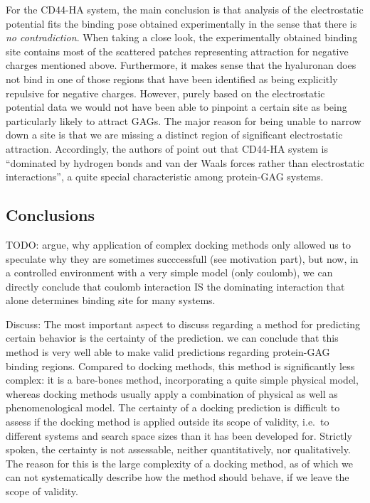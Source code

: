 For the CD44-HA system, the main conclusion is that analysis of the
electrostatic potential fits the binding pose obtained experimentally in the
sense that there is \textit{no contradiction}. When taking a close look, the
experimentally obtained binding site contains most of the scattered patches
representing attraction for negative charges mentioned above. Furthermore, it
makes sense that the hyaluronan does not bind in one of those regions that have
been identified as being explicitly repulsive for negative charges. However,
purely based on the electrostatic potential data we would not have been able to
pinpoint a certain site as being particularly likely to attract GAGs. The major
reason for being unable to narrow down a site is that we are missing a distinct
region of significant electrostatic attraction. Accordingly, the authors of
\cite{cd44_hya_2007} point out that CD44-HA system is  \enquote{dominated by
hydrogen bonds and van der Waals forces rather than electrostatic interactions},
a quite special characteristic among protein-GAG systems.



\subsection{Conclusions}

TODO: argue, why application of complex docking methods only allowed us to
speculate why they are sometimes succcessfull (see motivation part), but now,
in a controlled environment with a very simple model (only coulomb), we can
directly conclude that coulomb interaction IS the dominating interaction that
alone determines binding site for many systems.

Discuss: The most important aspect to discuss regarding a method for predicting
certain behavior is the certainty of the prediction. we can conclude that this
method is very well able to make valid predictions regarding protein-GAG binding
regions. Compared to docking methods, this method is significantly less complex:
it is a bare-bones method, incorporating a quite simple physical model, whereas
docking methods usually apply a combination of physical as well as
phenomenological model. The certainty of a docking prediction is difficult to
assess if the docking method is applied outside its scope of validity, i.e.\ to
different systems and search space sizes than it has been developed for.
Strictly spoken, the certainty is not assessable, neither quantitatively, nor
qualitatively. The reason for this is the large complexity of a docking method,
as of which we can not systematically describe how the method should behave, if
we leave the scope of validity.

